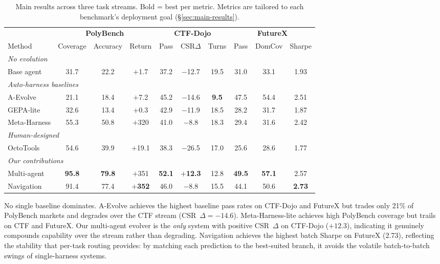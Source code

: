 \begin{table}[t]
\centering
\small
\setlength{\tabcolsep}{4pt}
\caption{Main results across three task streams. Bold = best per metric. Metrics are tailored to each benchmark's deployment goal (\S\ref{sec:main-results}).}
\label{tab:rq1_main}
\begin{tabular}{l@{\hskip 8pt}ccc@{\hskip 8pt}ccc@{\hskip 8pt}ccc}
\toprule
 & \multicolumn{3}{c}{\textbf{PolyBench}} & \multicolumn{3}{c}{\textbf{CTF-Dojo}} & \multicolumn{3}{c}{\textbf{FutureX}} \\
\cmidrule(lr){2-4} \cmidrule(lr){5-7} \cmidrule(lr){8-10}
Method & Coverage & Accuracy & Return & Pass & CSR$\Delta$ & Turns & Pass & DomCov & Sharpe \\
\midrule
\multicolumn{10}{l}{\emph{No evolution}} \\
Base agent      & 31.7 & 22.2 & $+$1.7 & 37.2 & $-$12.7 & 19.5 & 31.0 & 33.1 & 1.93 \\
\midrule
\multicolumn{10}{l}{\emph{Auto-harness baselines}} \\
A-Evolve        & 21.1 & 18.4 & $+$7.2 & 45.2 & $-$14.6 & \textbf{9.5} & 47.5 & 54.4 & 2.51 \\
GEPA-lite       & 32.6 & 13.4 & $+$0.3 & 42.9 & $-$11.9 & 18.5 & 28.2 & 31.7 & 1.87 \\
Meta-Harness    & 55.3 & 50.8 & $+$320 & 41.0 & $-$8.8 & 18.3 & 29.4 & 31.6 & 2.42 \\
\midrule
\multicolumn{10}{l}{\emph{Human-designed}} \\
OctoTools       & 54.6 & 39.9 & $+$19.1 & 38.3 & $-$26.5 & 17.0 & 25.6 & 28.6 & 1.77 \\
\midrule
\multicolumn{10}{l}{\emph{Our contributions}} \\
Multi-agent     & \textbf{95.8} & \textbf{79.8} & $+$351 & \textbf{52.1} & \textbf{$+$12.3} & 12.8 & \textbf{49.5} & \textbf{57.1} & 2.57 \\
Navigation      & 91.4 & 77.4 & \textbf{$+$352} & 46.0 & $-$8.8 & 15.5 & 44.1 & 50.6 & \textbf{2.73} \\
\bottomrule
\end{tabular}

\end{table}

No single baseline dominates. A-Evolve achieves the highest baseline pass rates on CTF-Dojo and FutureX but trades only 21\% of PolyBench markets and degrades over the CTF stream (CSR~$\Delta = -14.6$). Meta-Harness-lite achieves high PolyBench coverage but trails on CTF and FutureX. Our multi-agent evolver is the \emph{only} system with positive CSR~$\Delta$ on CTF-Dojo ($+12.3$), indicating it genuinely compounds capability over the stream rather than degrading. Navigation achieves the highest batch Sharpe on FutureX (2.73), reflecting the stability that per-task routing provides: by matching each prediction to the best-suited branch, it avoids the volatile batch-to-batch swings of single-harness systems.

